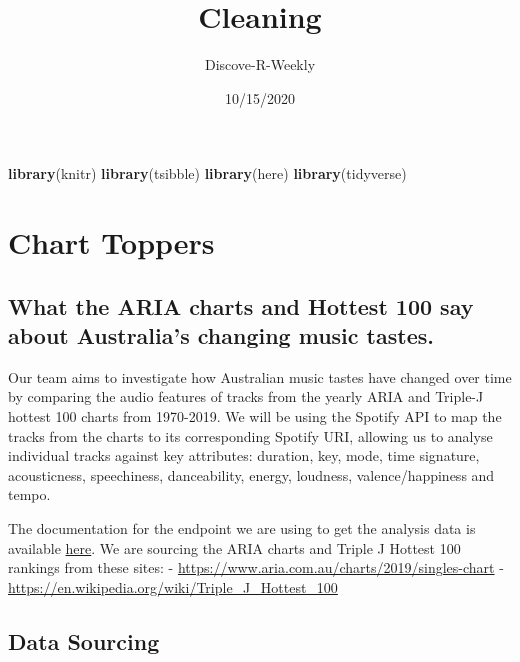 \documentclass[
]{article}
\title{Cleaning}
\author{Discove-R-Weekly}
\date{10/15/2020}
\newenvironment{Shaded}{\begin{snugshade}}{\end{snugshade}}
\newcommand{\KeywordTok}[1]{\textcolor[rgb]{0.13,0.29,0.53}{\textbf{#1}}}
\newcommand{\NormalTok}[1]{#1}
\begin{document}
\maketitle

\begin{Shaded}
\begin{Highlighting}[]
\KeywordTok{library}\NormalTok{(knitr)}
\KeywordTok{library}\NormalTok{(tsibble)}
\KeywordTok{library}\NormalTok{(here)}
\KeywordTok{library}\NormalTok{(tidyverse)}
\end{Highlighting}
\end{Shaded}

\hypertarget{chart-toppers}{%
\section{Chart Toppers}\label{chart-toppers}}

\hypertarget{what-the-aria-charts-and-hottest-100-say-about-australias-changing-music-tastes.}{%
\subsection{What the ARIA charts and Hottest 100 say about Australia's
changing music
tastes.}\label{what-the-aria-charts-and-hottest-100-say-about-australias-changing-music-tastes.}}

Our team aims to investigate how Australian music tastes have changed
over time by comparing the audio features of tracks from the yearly ARIA
and Triple-J hottest 100 charts from 1970-2019. We will be using the
Spotify API to map the tracks from the charts to its corresponding
Spotify URI, allowing us to analyse individual tracks against key
attributes: duration, key, mode, time signature, acousticness,
speechiness, danceability, energy, loudness, valence/happiness and
tempo.

The documentation for the endpoint we are using to get the analysis data
is available
\href{https://developer.spotify.com/documentation/web-api/reference/tracks/get-audio-features/}{here}.
We are sourcing the ARIA charts and Triple J Hottest 100 rankings from
these sites: - \url{https://www.aria.com.au/charts/2019/singles-chart} -
\url{https://en.wikipedia.org/wiki/Triple_J_Hottest_100}

\hypertarget{data-sourcing}{%
\subsection{Data Sourcing}\label{data-sourcing}}
\end{document}
